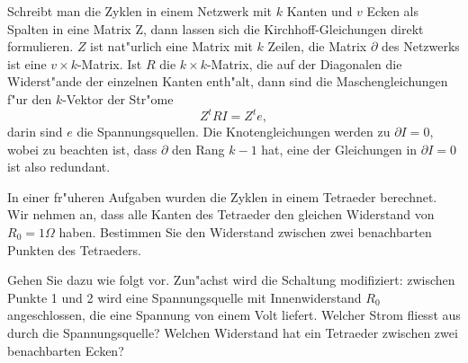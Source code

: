 Schreibt man die Zyklen in einem Netzwerk mit $k$ Kanten und $v$ Ecken
als Spalten in eine Matrix Z,
dann lassen sich die Kirchhoff-Gleichungen direkt formulieren.
$Z$ ist nat"urlich eine Matrix mit $k$ Zeilen, die Matrix $\partial$
des Netzwerks ist eine $v\times k$-Matrix.
Ist $R$ die $k\times k$-Matrix, die auf der Diagonalen die Widerst"ande der
einzelnen Kanten enth"alt, dann sind die Maschengleichungen f"ur den
$k$-Vektor der Str"ome 
\[
Z^tRI=Z^te,
\]
darin sind $e$ die Spannungsquellen.
Die Knotengleichungen werden zu $\partial I=0$, wobei zu beachten ist,
dass $\partial$ den Rang $k-1$ hat, eine der Gleichungen in $\partial I=0$ 
ist also redundant.

In einer fr"uheren Aufgaben wurden die Zyklen in einem Tetraeder berechnet.
Wir nehmen an, dass alle Kanten des Tetraeder den gleichen Widerstand von
$R_0=1\Omega$ haben. Bestimmen Sie den Widerstand zwischen zwei benachbarten
Punkten des Tetraeders.

\begin{hinweis}
Gehen Sie dazu wie folgt vor.
Zun"achst wird die Schaltung modifiziert: zwischen Punkte 1 und 2 wird eine
Spannungsquelle mit Innenwiderstand $R_0$ angeschlossen,
die eine Spannung von einem Volt liefert.
Welcher Strom fliesst aus durch die Spannungsquelle? Welchen Widerstand
hat ein Tetraeder zwischen zwei benachbarten Ecken?
\end{hinweis}

